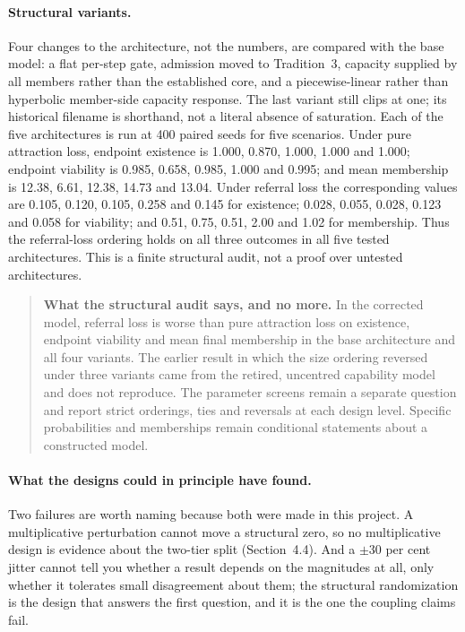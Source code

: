 \documentclass[11pt,a4paper]{article}
\begin{document}
\paragraph{Structural variants.} Four changes to the architecture, not the
numbers, are compared with the base model: a flat per-step gate, admission moved
to Tradition~3, capacity supplied by all members rather than the established
core, and a piecewise-linear rather than hyperbolic member-side capacity response.
The last variant still clips at one; its historical filename is shorthand, not a
literal absence of saturation. Each of the
five architectures is run at 400 paired seeds for five scenarios. Under pure
attraction loss, endpoint existence is 1.000, 0.870, 1.000, 1.000 and 1.000;
endpoint viability is 0.985, 0.658, 0.985, 1.000 and 0.995; and mean membership is
12.38, 6.61, 12.38, 14.73 and 13.04. Under referral loss the corresponding values
are 0.105, 0.120, 0.105, 0.258 and 0.145 for existence; 0.028, 0.055, 0.028, 0.123
and 0.058 for viability; and 0.51, 0.75, 0.51, 2.00 and 1.02 for membership. Thus
the referral-loss ordering holds on all three outcomes in all five tested
architectures. This is a finite structural audit, not a proof over untested
architectures.

\begin{quote}\small
\textbf{What the structural audit says, and no more.} In the corrected model,
referral loss is worse than pure attraction loss on existence, endpoint viability
and mean final membership in the base architecture and all four variants. The
earlier result in which the size ordering reversed under three variants came from
the retired, uncentred capability model and does not reproduce. The parameter
screens remain a separate question and report strict orderings, ties and reversals
at each design level. Specific probabilities and memberships remain conditional
statements about a constructed model.
\end{quote}

\paragraph{What the designs could in principle have found.} Two failures are worth
naming because both were made in this project. A multiplicative perturbation
cannot move a structural zero, so no multiplicative design is evidence about the
two-tier split (Section~4.4). And a $\pm30$ per cent jitter cannot tell you
whether a result depends on the magnitudes at all, only whether it tolerates small
disagreement about them; the structural randomization is the design that answers
the first question, and it is the one the coupling claims fail.
\end{document}
